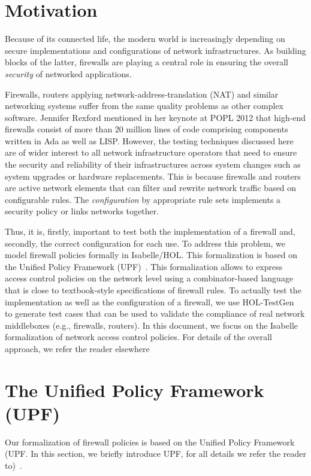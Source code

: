 \section{Motivation}
Because of its connected life, the modern world is increasingly
depending on secure implementations and configurations of network
infrastructures. As building blocks of the latter, firewalls are
playing a central role in ensuring the overall \emph{security} of
networked applications.

Firewalls, routers applying network-address-translation (NAT) and
similar networking systems suffer from the same quality problems as
other complex software. Jennifer Rexford mentioned in her keynote at
POPL 2012 that high-end firewalls consist of more than 20
million lines of code comprising components written in Ada as well as
LISP. However, the testing techniques discussed here are of
wider interest to all network infrastructure operators that need to
ensure the security and reliability of their infrastructures across
system changes such as system upgrades or hardware replacements. This
is because firewalls and routers are active network elements that can
filter and rewrite network traffic based on configurable rules. The
\emph{configuration} by appropriate rule sets implements a security
policy or links networks together.

Thus, it is, firstly, important to test both the implementation of a
firewall and, secondly, the correct configuration for each use. To
address this problem, we model firewall policies formally in
Isabelle/HOL. This formalization is based on the Unified Policy
Framework (UPF)~\cite{brucker.ea:upf:2014}. This formalization allows
to express access control policies on the network level using a
combinator-based language that is close to textbook-style
specifications of firewall rules. To actually test the implementation
as well as the configuration of a firewall, we use
HOL-TestGen~\cite{brucker.ea:hol-testgen-fw:2013,brucker.ea:theorem-prover:2012}
to generate test cases that can be used to validate the compliance of
real network middleboxes (e.g., firewalls, routers). In this document,
we focus on the Isabelle formalization of network access control
policies. For details of the overall approach, we refer the reader
elsewhere~\cite{brucker.ea:formal-fw-testing:2014}

\section{The Unified Policy Framework (UPF)}
Our formalization of firewall policies is based on the Unified Policy
Framework (UPF. In this section, we briefly introduce UPF, for all
details we refer the reader to)~\cite{brucker.ea:upf:2014}.

